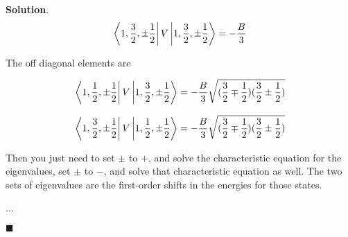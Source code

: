 \documentclass[12pt]{article}
\theoremstyle{definition}
\newenvironment{s}{%
        \begin{trivlist} \item \textbf{Solution}. }{%
            \hspace*{\fill} $\blacksquare$\end{trivlist}}%
\begin{document}
{\begin{s}
\begin{align*}
\bra{1,\frac{3}{2},\pm\frac{1}{2}}V\ket{1,\frac{3}{2},\pm\frac{1}{2}} = - \frac{B}{3}
\end{align*}

The off diagonal elements are

\begin{align*}
\bra{1,\frac{1}{2},\pm\frac{1}{2}}V\ket{1,\frac{3}{2},\pm\frac{1}{2}} = -\frac{B}{3}\sqrt{(\frac{3}{2}\mp \frac{1}{2})(\frac{3}{2}\pm \frac{1}{2})}
\end{align*}

\begin{align*}
\bra{1,\frac{3}{2},\pm\frac{1}{2}}V\ket{1,\frac{1}{2},\pm\frac{1}{2}} = -\frac{B}{3}\sqrt{(\frac{3}{2}\mp \frac{1}{2})(\frac{3}{2}\pm \frac{1}{2})}
\end{align*}

Then you just need to set $\pm$ to $+$, and solve the characteristic equation for the eigenvalues, set $\pm$ to $-$, and solve that characteristic equation as well. The two sets of eigenvalues are the first-order shifts in the energies for those states.

...





\end{s}
\end{document}
